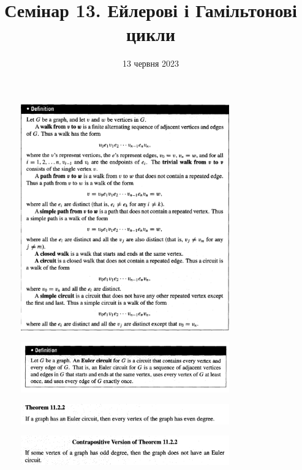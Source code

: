 \documentclass{article}
\begin{document}
\title{Семінар 13. Ейлерові і Гамільтонові цикли}
\date{13 червня 2023}

\maketitle

\begin{figure}[ht!]
\centering
\includegraphics[width=90mm]{1}
\end{figure}

\begin{figure}
\centering
\includegraphics[width=90mm]{2}
\end{figure}

\begin{figure}
\centering
\includegraphics[width=90mm]{3}
\end{figure}

\begin{figure}
\centering
\includegraphics[width=90mm]{4}
\end{figure}
\end{document}
